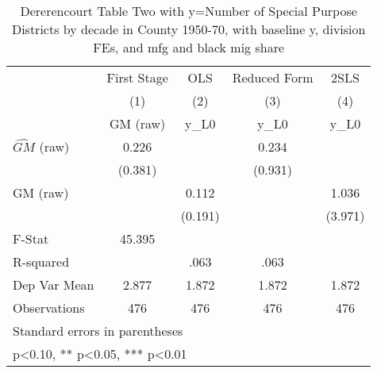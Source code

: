 \begin{table}[htbp]\centering
\def\sym#1{\ifmmode^{#1}\else\(^{#1}\)\fi}
\caption{Dererencourt Table Two with y=Number of Special Purpose Districts by decade in County 1950-70, with baseline y, division FEs, and mfg and black mig share}
\begin{tabular}{l*{4}{c}}
\toprule
                    & First Stage   &         OLS   &Reduced Form   &        2SLS   \\
                    &\multicolumn{1}{c}{(1)}&\multicolumn{1}{c}{(2)}&\multicolumn{1}{c}{(3)}&\multicolumn{1}{c}{(4)}\\
                    &\multicolumn{1}{c}{GM  (raw)}&\multicolumn{1}{c}{y\_L0}&\multicolumn{1}{c}{y\_L0}&\multicolumn{1}{c}{y\_L0}\\
\midrule
$\hat{GM}$ (raw)    &       0.226   &               &       0.234   &               \\
                    &     (0.381)   &               &     (0.931)   &               \\
\addlinespace
GM  (raw)           &               &       0.112   &               &       1.036   \\
                    &               &     (0.191)   &               &     (3.971)   \\
\midrule
F-Stat              &      45.395   &               &               &               \\
R-squared           &               &        .063   &        .063   &               \\
Dep Var Mean        &       2.877   &       1.872   &       1.872   &       1.872   \\
Observations        &         476   &         476   &         476   &         476   \\
\bottomrule
\multicolumn{5}{l}{\footnotesize Standard errors in parentheses}\\
\multicolumn{5}{l}{\footnotesize * p<0.10, ** p<0.05, *** p<0.01}\\
\end{tabular}
\end{table}
